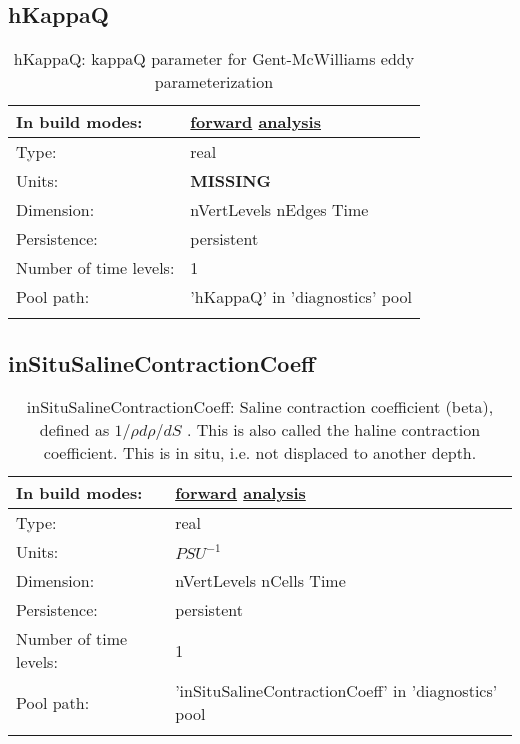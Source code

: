 \subsection[hKappaQ]{hKappaQ}
\label{subsec:var_sec_diagnostics_hKappaQ}
\begin{center}
\begin{longtable}{| p{2.0in} | p{4.0in} |}
        \hline 
        In build modes: & \hyperref[subsec:forward_var_tab_diagnostics]{forward} \hyperref[subsec:analysis_var_tab_diagnostics]{analysis} \\
        \hline 
        Type: & real \\
        \hline 
        Units: & {\bf \color{red} MISSING} \\
        \hline 
        Dimension: & nVertLevels nEdges Time \\
        \hline 
        Persistence: & persistent \\
        \hline 
        Number of time levels: & 1 \\
        \hline 
            Pool path: & 'hKappaQ' in 'diagnostics' pool
 \\
		 \hline 
    \caption{hKappaQ: kappaQ parameter for Gent-McWilliams eddy parameterization}
\end{longtable}
\end{center}
\subsection[inSituSalineContractionCoeff]{inSituSalineContractionCoeff}
\label{subsec:var_sec_diagnostics_inSituSalineContractionCoeff}
\begin{center}
\begin{longtable}{| p{2.0in} | p{4.0in} |}
        \hline 
        In build modes: & \hyperref[subsec:forward_var_tab_diagnostics]{forward} \hyperref[subsec:analysis_var_tab_diagnostics]{analysis} \\
        \hline 
        Type: & real \\
        \hline 
        Units: & $PSU^{-1}$ \\
        \hline 
        Dimension: & nVertLevels nCells Time \\
        \hline 
        Persistence: & persistent \\
        \hline 
        Number of time levels: & 1 \\
        \hline 
            Pool path: & 'inSituSalineContractionCoeff' in 'diagnostics' pool
 \\
		 \hline 
    \caption{inSituSalineContractionCoeff:  Saline contraction coefficient (beta), defined as  $1/\rho d\rho/dS$ .  This is also called the haline contraction coefficient.  This is in situ, i.e. not displaced to another depth.}
\end{longtable}
\end{center}

